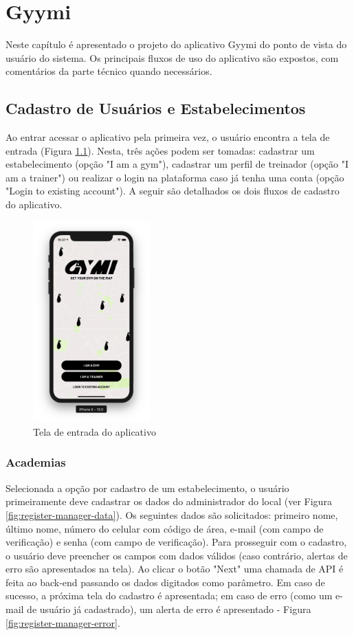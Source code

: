 \chapter{Gyymi}
Neste capítulo é apresentado o projeto do aplicativo Gyymi do ponto de vista do usuário do sistema. Os principais fluxos de uso do aplicativo são expostos, com comentários da parte técnico quando necessários.

\section{Cadastro de Usuários e Estabelecimentos}
Ao entrar acessar o aplicativo pela primeira vez, o usuário encontra a tela de entrada (Figura \ref{fig:landing}). Nesta, três ações podem ser tomadas: cadastrar um estabelecimento (opção "I am a gym"), cadastrar um perfil de treinador (opção "I am a trainer") ou realizar o login na plataforma caso já tenha uma conta (opção "Login to existing account"). A seguir são detalhados os dois fluxos de cadastro do aplicativo.
\begin{figure}[H]
    \centering
    \includegraphics[width=0.4\textwidth]{pfc/figuras/landing.png}
    \caption{Tela de entrada do aplicativo}
    \label{fig:landing}
\end{figure}

\subsection{Academias} \label{sec:register-gym}
Selecionada a opção por cadastro de um estabelecimento, o usuário primeiramente deve cadastrar os dados do administrador do local (ver Figura \ref{fig:register-manager-data}). Os seguintes dados são solicitados: primeiro nome, último nome, número do celular com código de área, e-mail (com campo de verificação) e senha (com campo de verificação). Para prosseguir com o cadastro, o usuário deve preencher os campos com dados válidos (caso contrário, alertas de erro são apresentados na tela). Ao clicar o botão "Next" uma chamada de API é feita ao back-end passando os dados digitados como parâmetro. Em caso de sucesso, a próxima tela do cadastro é apresentada; em caso de erro (como um e-mail de usuário já cadastrado), um alerta de erro é apresentado - Figura \ref{fig:register-manager-error}.

